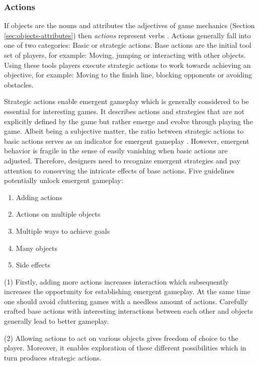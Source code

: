 \subsubsection{Actions}
If objects are the nouns and attributes the adjectives of game mechanics (Section \ref{sec:objects-attributes}) then \textit{actions} represent verbs \cite{Schell2014}.
Actions generally fall into one of two categories: Basic or strategic actions.
Base actions are the initial tool set of players, for example: Moving, jumping or interacting with other objects.
Using these tools players execute strategic actions to work towards achieving an objective, for example: Moving to the finish line, blocking opponents or avoiding obstacles.

Strategic actions enable emergent gameplay which is generally considered to be essential for interesting games.
It describes actions and strategies that are not explicitly defined by the game but rather emerge and evolve through playing the game.
Albeit being a subjective matter, the ratio between strategic actions to basic actions serves as an indicator for emergent gameplay \cite{Schell2014}.
However, emergent behavior is fragile in the sense of easily vanishing when basic actions are adjusted.
Therefore, designers need to recognize emergent strategies and pay attention to conserving the intricate effects of base actions.
Five guidelines potentially unlock emergent gameplay:

\begin{enumerate}
    \item Adding actions
    \item Actions on multiple objects
    \item Multiple ways to achieve goals
    \item Many objects
    \item Side effects
\end{enumerate}

(1) Firstly, adding more actions increases interaction which subsequently increases the opportunity for establishing emergent gameplay.
At the same time one should avoid cluttering games with a needless amount of actions.
Carefully crafted base actions with interesting interactions between each other and objects generally lead to better gameplay.

(2) Allowing actions to act on various objects gives freedom of choice to the player.
Moreover, it enables exploration of these different possibilities which in turn produces strategic actions.

